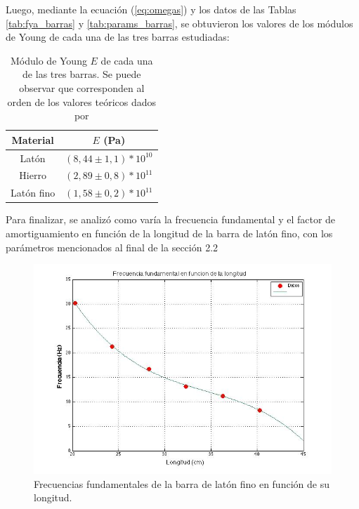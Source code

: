 \documentclass[twoside,twocolumn,a4paper]{article}
\begin{document}
Luego, mediante la ecuaci\'on (\ref{eq:omegas}) y los datos de las Tablas \ref{tab:fya_barras} y \ref{tab:params_barras}, se obtuvieron los valores de los m\'odulos de Young de cada una de las tres barras estudiadas:

\begin{table}[H]
\centering
\caption{M\'odulo de Young $E$ de cada una de las tres barras. Se puede observar que corresponden al orden de los valores te\'oricos dados por \cite{teo:ashby}}

\label{tab:young_barras}
\begin{tabular}{|c|c|}
\hline
Material & $E$ (Pa)\\ \hline
Lat\'on & $(8,44 \pm 1,1) * 10^{10}$\\ \hline
Hierro & $(2,89 \pm 0,8) * 10^{11}$\\ \hline
Lat\'on fino & $(1,58 \pm 0,2) * 10^{11}$\\ \hline
\end{tabular}
\end{table}

Para finalizar, se analiz\'o como var\'ia la frecuencia fundamental y el factor de amortiguamiento en funci\'on de la longitud de la barra de lat\'on fino, con los par\'ametros mencionados al final de  la secci\'on 2.2

\begin{figure}[H]
\includegraphics[width=\linewidth]{fvsl.jpg}
\caption{Frecuencias fundamentales de la barra de lat\'on fino en funci\'on de su longitud.}
\label{fig:fvsl}
\end{figure}
\end{document}
